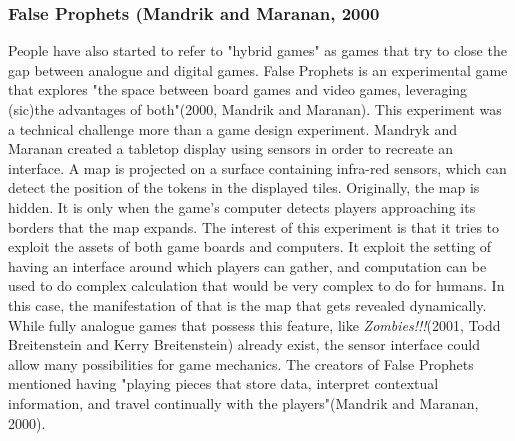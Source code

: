 \subsubsection{False Prophets (Mandrik and Maranan, 2000}
People have also started to refer to "hybrid games" as games that try to close the gap between analogue and digital games. False Prophets is an experimental game that explores "the space between board games and video games, leveraging (sic)the advantages of both"(2000, Mandrik and Maranan). This experiment was a technical challenge more than a game design experiment. Mandryk and Maranan created a tabletop display using sensors in order to recreate an interface. A map is projected on a surface containing infra-red sensors, which can detect the position of the tokens in the displayed tiles. Originally, the map is hidden. It is only when the game's computer detects players approaching its borders that the map expands. The interest of this experiment is that it tries to exploit the assets of both game boards and computers. It exploit the setting of having an interface around which players can gather, and computation can be used to do complex calculation that would be very complex to do for humans. In this case, the manifestation of that is the map that gets revealed dynamically. While fully analogue games  that possess this feature, like \textit{Zombies!!!}(2001, Todd Breitenstein and Kerry Breitenstein) already exist, the sensor interface could allow many possibilities for game mechanics. The creators of False Prophets mentioned having "playing pieces that store data, interpret contextual information, and travel continually with the players"(Mandrik and Maranan, 2000).
